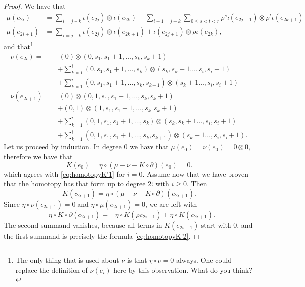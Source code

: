 \begin{proof}
	We have that
	\begin{align*}
		\mu(e_{2i}) &= \sum_{i=j+k} \iota(e_{2j})\otimes \iota(e_{2k}) + \sum_{i-1=j+k}\sum_{0\leq s<t<r} \rho^s\iota(e_{2j+1})\otimes \rho^t\iota(e_{2k+1}) \\
		\mu(e_{2i+1}) &= \sum_{i=j+k} \iota(e_{2j})\otimes \iota(e_{2k+1}) + \iota(e_{2j+1})\otimes \rho \iota(e_{2k}),
	\end{align*}
	and that\footnote{The only thing that is used about $\nu$ is that $\eta\circ \nu = 0$ always. One could replace the definition of $\nu(e_i)$ here by this observation. What do you think?}
	\begin{align*}
		\nu(e_{2i}) =&\  (0)\otimes(0,s_1,s_1+1,\ldots,s_k,s_k+1) \\
		&+ \sum_{k=1}^i(0,s_1,s_1+1,\ldots,s_k)\otimes(s_k,s_k+1\ldots,s_i,s_i+1) \\
		&+ \sum_{k=1}^i(0,s_1,s_1+1,\ldots,s_k,s_{k+1})\otimes(s_k+1\ldots,s_i,s_i+1) \\
		\nu(e_{2i+1}) =&\ (0)\otimes(0,1,s_1,s_1+1,\ldots,s_k,s_k+1) \\
		&+ (0,1)\otimes(1,s_1,s_1+1,\ldots,s_k,s_k+1) \\
		&+ \sum_{k=1}^i(0,1,s_1,s_1+1,\ldots,s_k)\otimes(s_k,s_k+1\ldots,s_i,s_i+1) \\
		&+ \sum_{k=1}^i(0,1,s_1,s_1+1,\ldots,s_k,s_{k+1})\otimes(s_k+1\ldots,s_i,s_i+1).
	\end{align*}
	Let us proceed by induction. In degree $0$ we have that $\mu(e_0) = \nu(e_0) = 0\otimes 0$, therefore we have that
	\[K(e_0) = \eta\circ (\mu-\nu-K\circ\partial)(e_0) = 0.\]
	which agrees with \eqref{eq:homotopyK'1} for $i=0$. Assume now that we have proven that the homotopy has that form up to degree $2i$ with $i\geq 0$. Then
	\[K(e_{2i+1}) = \eta\circ (\mu-\nu-K\circ\partial)(e_{2i+1}).\]
	Since $\eta\circ \nu(e_{2i+1}) = 0$ and $\eta\circ\mu(e_{2i+1}) = 0$, we are left with
	\[-\eta\circ K\circ\partial(e_{2i+1}) = -\eta\circ K (\rho e_{2i+1}) + \eta\circ K (e_{2i+1}).
	\]
	The second summand vanishes, because all terms in $K(e_{2i+1})$ start with $0$, and the first summand is precisely the formula \eqref{eq:homotopyK'2}.


\end{proof}
